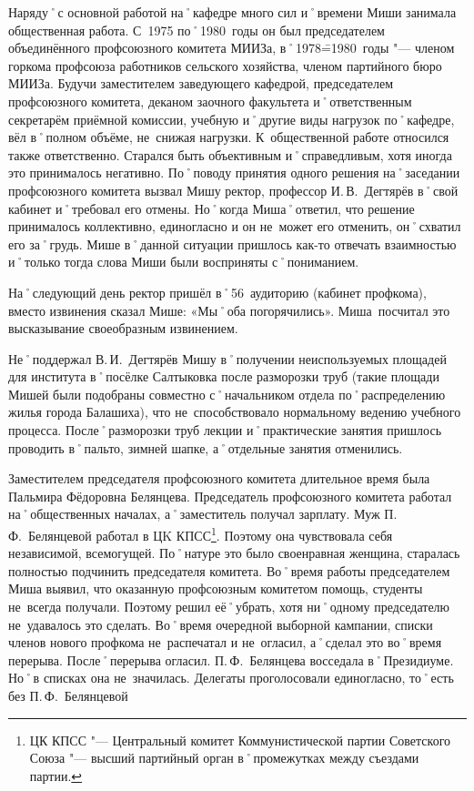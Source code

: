 Наряду˚с основной работой на˚кафедре много сил и˚времени Миши занимала общественная работа. С~1975 по˚1980~годы он был председателем объединённого профсоюзного комитета МИИЗа, в˚1978\==1980~годы "--- членом горкома профсоюза работников сельского хозяйства, членом партийного бюро МИИЗа. Будучи заместителем заведующего кафедрой, председателем профсоюзного комитета, деканом заочного факультета и˚ответственным секретарём приёмной комиссии, учебную и˚другие виды нагрузок по˚кафедре, вёл в˚полном объёме, не~снижая нагрузки. К~общественной работе относился также ответственно. Старался быть объективным и˚справедливым, хотя иногда это принималось негативно. По˚поводу принятия одного решения на˚заседании профсоюзного комитета вызвал Мишу ректор, профессор И.\,В.~Дегтярёв в˚свой кабинет и˚требовал его отмены. Но˚когда Миша˚ответил, что решение принималось коллективно, единогласно и он не~может его отменить, он˚схватил его за˚грудь. Мише в˚данной ситуации пришлось как-то отвечать взаимностью и˚только тогда слова Миши были восприняты с˚пониманием.

На˚следующий день ректор пришёл в˚56~аудиторию (кабинет профкома), вместо извинения сказал Мише: «Мы˚оба погорячились». Миша~посчитал это высказывание своеобразным извинением.

Не˚поддержал В.\,И.~Дегтярёв Мишу в˚получении неиспользуемых площадей для института в˚посёлке Салтыковка после разморозки труб (такие площади Мишей были подобраны совместно с˚начальником отдела по˚распределению жилья города Балашиха), что не~способствовало нормальному ведению учебного процесса. После˚разморозки труб лекции и˚практические занятия пришлось проводить в˚пальто, зимней шапке, а˚отдельные занятия отменились.

Заместителем председателя профсоюзного комитета длительное время была Пальмира Фёдоровна Белянцева. Председатель профсоюзного комитета работал на˚общественных началах, а˚заместитель получал зарплату. Муж П.\,Ф.~Белянцевой работал в ЦK КПСС\footnote{ЦК КПСС "--- Центральный комитет Коммунистической партии Советского Союза "--- высший партийный орган в˚промежутках между съездами партии.}. Поэтому она чувствовала себя независимой, всемогущей. По˚натуре это было своенравная женщина, старалась полностью подчинить председателя комитета. Во˚время работы председателем Миша выявил, что оказанную профсоюзным комитетом помощь, студенты не~всегда получали. Поэтому решил её˚убрать, хотя ни˚одному председателю не~удавалось это сделать. Во˚время очередной выборной кампании, списки членов нового профкома не~распечатал и не~огласил, а˚сделал это во˚время перерыва. После˚перерыва огласил. П.\,Ф.~Белянцева восседала в˚Президиуме. Но˚в списках она не~значилась. Делегаты проголосовали единогласно, то˚есть без П.\,Ф.~Белянцевой 

